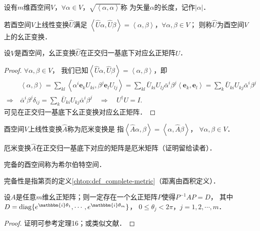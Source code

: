 \begin{definition}
    设有$m$维酉空间$V$，$\forall \alpha \in V$，$\sqrt{\left<\alpha,\alpha\right>}$称
    为矢量$\alpha$的{\heiti 长度}，记作$|\alpha|$．    
\end{definition}

\begin{definition}
    若酉空间$V$上线性变换$\hat{U}$满足
    $\left<\hat{U}\alpha,\hat{U}\beta\right>=\left<\alpha,\beta\right>$，$\forall \alpha,\beta \in V$；
    则称$\hat{U}$为酉空间$V$上的{\heiti 幺正变换}．
\end{definition}


\begin{theorem}
    设$V$是酉空间，幺正变换$\hat{U}$在正交归一基底下对应幺正矩阵$U$．
\end{theorem}
\begin{proof}
    $\forall \alpha,\beta \in V$，
    我们已知$\left<\hat{U}\alpha,\hat{U}\beta\right>=\left<\alpha,\beta\right>$，即
    \begin{align*}
        &\left<\alpha,\beta\right>=\sum_{kl}\left<\alpha^i \boldsymbol{e}_k U_{ki}, \beta^j \boldsymbol{e}_l U_{lj} \right>
        =\sum_{kl}\bar{U}_{ki} U_{lj} \bar{\alpha}^i \beta^j \left< \boldsymbol{e}_k, \boldsymbol{e}_l\right>
        =\sum_k \bar{U}_{ki} U_{kj} \bar{\alpha}^i \beta^j \\
        \Rightarrow\ & \bar{\alpha}^i \beta^j \delta_{ij}=\sum_k \bar{U}_{ki} U_{kj} \bar{\alpha}^i \beta^j 
        \quad \Rightarrow \quad U^\dagger U = I.
    \end{align*}
    可见在正交归一基底下幺正变换对应幺正矩阵．
\end{proof}

\begin{definition}
    酉空间$V$上线性变换$\hat{A}$称为{\heiti 厄米变换}是
    指$\left<\hat{A}\alpha,\beta\right>=\left<\alpha,\hat{A}\beta\right>$，
    $\forall \alpha,\beta\in V$．
\end{definition}
厄米变换$\hat{A}$在正交归一基底下对应的矩阵是厄米矩阵（证明留给读者）．


\begin{definition}\label{chcx:def_Hilbert-Space}
    完备的酉空间称为希尔伯特空间．
\end{definition}
完备性是指第\pageref{chtop:def_complete-metric}页的定义\ref{chtop:def_complete-metric}（距离由酉积定义）．



\begin{theorem}\label{chcx:thm_UD}
	设$A$是任意$m$维幺正矩阵；则一定存在一个幺正矩阵$P$使得$P^{-1}A P=D$，
	其中$D={\rm diag}\{e^{\mathbbm{i}\theta_1},\cdots,e^{\mathbbm{i}\theta_m}\}$，
	$0\leqslant \theta_j <2\pi$，$j=1,2,\cdots,m$．
\end{theorem}
\begin{proof}
	证明可参考\parencite[p.522]{qiuws-2019-v2}定理16；或类似文献．
\end{proof}



